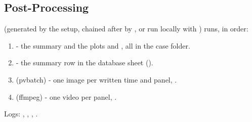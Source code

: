 \subsection{Post-Processing}\label{sec:internalPost}
 (generated by the setup, chained after  by , or run locally with ) runs, in order:
\begin{enumerate}
    \item {} - the summary  and the plots  and , all in the case folder.
    \item {} - the summary row in the database sheet ().
    \item {} (pvbatch) - one image per written time and panel, .
    \item {} (ffmpeg) - one video per panel, .
\end{enumerate}
Logs: , , , .

